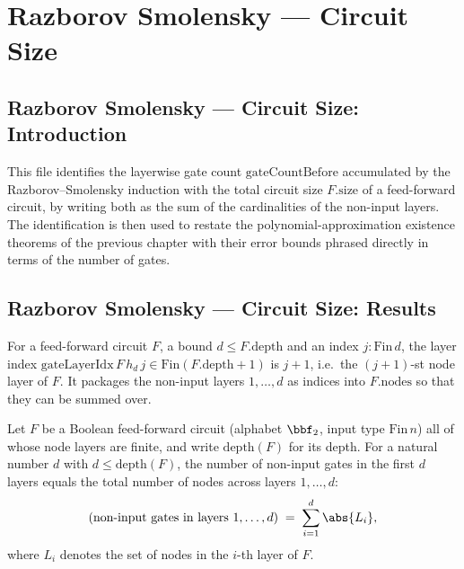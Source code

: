 \section{Razborov Smolensky --- Circuit Size}
\subsection*{Razborov Smolensky --- Circuit Size: Introduction}

This file identifies the layerwise gate count $\mathrm{gateCountBefore}$ accumulated by the
Razborov--Smolensky induction with the total circuit size $F.\mathrm{size}$ of a feed-forward
circuit, by writing both as the sum of the cardinalities of the non-input layers.  The
identification is then used to restate the polynomial-approximation existence theorems of the
previous chapter with their error bounds phrased directly in terms of the number of gates.

\subsection*{Razborov Smolensky --- Circuit Size: Results}

\begin{definition}
\label{RazborovSmolensky.gateLayerIdx}
\leanok
{}
For a feed-forward circuit $F$, a bound $d \le F.\mathrm{depth}$ and an index
$j : \mathrm{Fin}\,d$, the layer index $\mathrm{gateLayerIdx}\,F\,h_d\,j \in
\mathrm{Fin}(F.\mathrm{depth}+1)$ is $j+1$, i.e.\ the $(j+1)$-st node layer of $F$.  It packages the
non-input layers $1, \dots, d$ as indices into $F.\mathrm{nodes}$ so that they can be summed over.
\end{definition}

\begin{lemma}
\label{RazborovSmolensky.gateCountBefore_eq_sum_cards}
\leanok
{}
Let $F$ be a Boolean feed-forward circuit (alphabet $\bbf_2$, input type
$\mathrm{Fin}\,n$) all of whose node layers are finite, and write $\mathrm{depth}(F)$
for its depth. For a natural number $d$ with $d \le \mathrm{depth}(F)$, the number of
non-input gates in the first $d$ layers equals the total number of nodes across layers
$1,\dots,d$:
\[
(\text{non-input gates in layers } 1,\dots,d) \;=\; \sum_{i=1}^{d} \abs{L_i},
\]
where $L_i$ denotes the set of nodes in the $i$-th layer of $F$.
\end{lemma}


